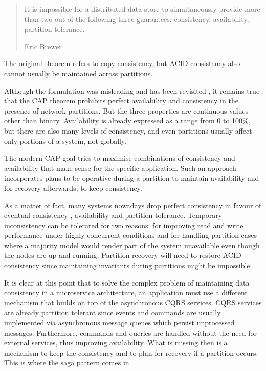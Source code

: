 \documentclass[conference]{IEEEtran}
\begin{document}
\begin{quote}
It is impossible for a distributed data store to simultaneously provide more than two out of the following three guarantees: consistency, availability, partition tolerance.

\hfill Eric Brewer
\end{quote}

The original theorem refers to copy consistency, but ACID consistency also cannot usually be maintained across partitions. 

Although the formulation was misleading and has been revisited \cite{cap-misleading}, it remains true that the CAP theorem prohibits perfect availability and consistency in the presence of network partitions. But the three properties are continuous values other than binary. Availability is already expressed as a range from 0 to 100\%, but there are also many levels of consistency, and even partitions usually affect only portions of a system, not globally.

The modern CAP goal tries to maximise combinations of consistency and availability that make sense for the specific application. Such an approach incorporates plans to be operative during a partition to maintain availability and for recovery afterwards, to keep consistency.

As a matter of fact, many systems nowadays drop perfect consistency in favour of eventual consistency \cite{consistency-vs-availability}, availability and partition tolerance. Temporary inconsistency can be tolerated for two reasons: for improving read and write performance under highly concurrent conditions and for handling partition cases where a majority model would render part of the system unavailable even though the nodes are up and running. Partition recovery will need to restore ACID consistency since maintaining invariants during partitions might be impossible.

It is clear at this point that to solve the complex problem of maintaining data consistency in a microservice architecture, an application must use a different mechanism that builds on top of the asynchronous CQRS services. CQRS services are already partition tolerant since events and commands are usually implemented via asynchronous message queues which persist unprocessed messages. Furthermore, commands and queries are handled without the need for external services, thus improving availability. What is missing then is a mechanism to keep the consistency and to plan for recovery if a partition occurs. This is where the saga pattern comes in.
\end{document}
